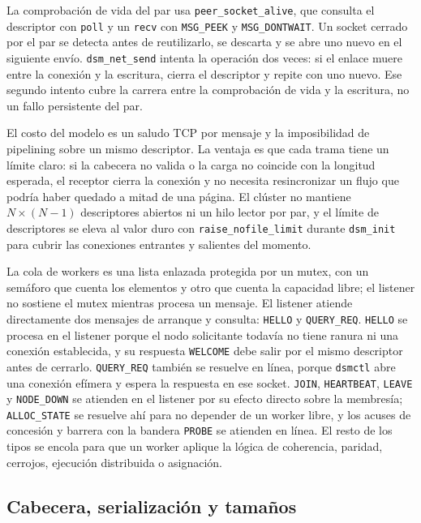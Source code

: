 La comprobación de vida del par usa \texttt{peer\_socket\_alive}, que consulta el descriptor con \texttt{poll} y un \texttt{recv} con \texttt{MSG\_PEEK} y \texttt{MSG\_DONTWAIT}. Un socket cerrado por el par se detecta antes de reutilizarlo, se descarta y se abre uno nuevo en el siguiente envío. \texttt{dsm\_net\_send} intenta la operación dos veces: si el enlace muere entre la conexión y la escritura, cierra el descriptor y repite con uno nuevo. Ese segundo intento cubre la carrera entre la comprobación de vida y la escritura, no un fallo persistente del par.

El costo del modelo es un saludo TCP por mensaje y la imposibilidad de pipelining sobre un mismo descriptor. La ventaja es que cada trama tiene un límite claro: si la cabecera no valida o la carga no coincide con la longitud esperada, el receptor cierra la conexión y no necesita resincronizar un flujo que podría haber quedado a mitad de una página. El clúster no mantiene $N \times (N-1)$ descriptores abiertos ni un hilo lector por par, y el límite de descriptores se eleva al valor duro con \texttt{raise\_nofile\_limit} durante \texttt{dsm\_init} para cubrir las conexiones entrantes y salientes del momento.

La cola de workers es una lista enlazada protegida por un mutex, con un semáforo que cuenta los elementos y otro que cuenta la capacidad libre; el listener no sostiene el mutex mientras procesa un mensaje. El listener atiende directamente dos mensajes de arranque y consulta: \texttt{HELLO} y \texttt{QUERY\_REQ}. \texttt{HELLO} se procesa en el listener porque el nodo solicitante todavía no tiene ranura ni una conexión establecida, y su respuesta \texttt{WELCOME} debe salir por el mismo descriptor antes de cerrarlo. \texttt{QUERY\_REQ} también se resuelve en línea, porque \texttt{dsmctl} abre una conexión efímera y espera la respuesta en ese socket. \texttt{JOIN}, \texttt{HEARTBEAT}, \texttt{LEAVE} y \texttt{NODE\_DOWN} se atienden en el listener por su efecto directo sobre la membresía; \texttt{ALLOC\_STATE} se resuelve ahí para no depender de un worker libre, y los acuses de concesión y barrera con la bandera \texttt{PROBE} se atienden en línea. El resto de los tipos se encola para que un worker aplique la lógica de coherencia, paridad, cerrojos, ejecución distribuida o asignación.

\subsection{Cabecera, serialización y tamaños}

